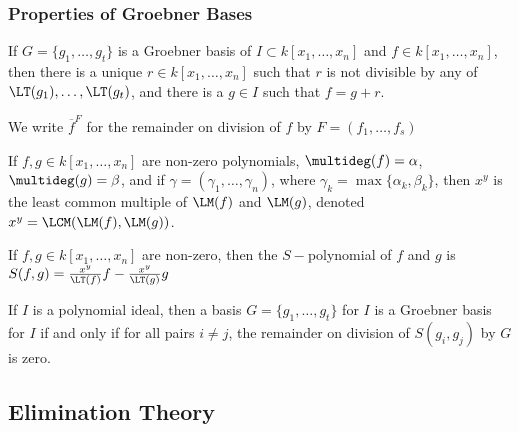 \documentclass[crop=false,class=book]{standalone}
\begin{document}
\subsubsection{Properties of Groebner Bases}
\begin{theorem}
If $G=\{g_1,\hdots, g_t\}$ is a Groebner basis of $I\subset k[x_1,\hdots ,x_n]$ and $f\in k[x_1,\hdots ,x_n]$, then there is a unique $r\in k[x_1,\hdots ,x_n]$ such that $r$ is not divisible by any of $\LT(g_1),\hdots, \LT(g_t)$, and there is a $g\in I$ such that $f = g+r$. 
\end{theorem}
\begin{notation}
We write $\overline{f}^{F}$ for the remainder on division of $f$ by $F = (f_{1},\hdots,f_{s})$
\end{notation}
\begin{definition}
If $f,g\in k[x_1,\hdots ,x_n]$ are non-zero polynomials, $\multideg(f) = \alpha$, $\multideg(g) = \beta$, and if $\gamma = (\gamma_1,\hdots, \gamma_n)$, where $\gamma_k = \max\{\alpha_k,\beta_k\}$, then $x^y$ is the least common multiple of $\LM(f)$ and $\LM(g)$, denoted $x^y = \LCM(\LM(f),\LM(g))$.
\end{definition}
\begin{definition}
If $f,g\in k[x_1,\hdots ,x_n]$ are non-zero, then the $S-$polynomial of $f$ and $g$ is $S(f,g) = \frac{x^y}{\LT(f)}f - \frac{x^y}{\LT(g)}g$
\end{definition}
\begin{theorem}
If $I$ is a polynomial ideal, then a basis $G=\{g_1,\hdots, g_t\}$ for $I$ is a Groebner basis for $I$ if and only if for all pairs $i\ne j$, the remainder on division of $S(g_i,g_j)$ by $G$ is zero.
\end{theorem}
\subsection{Elimination Theory}
\end{document}
